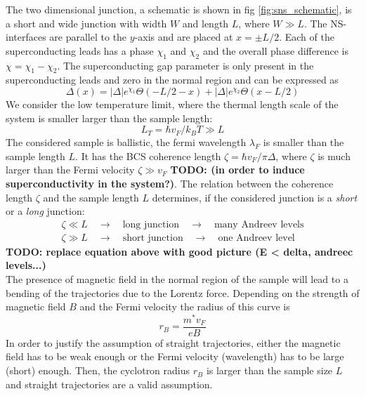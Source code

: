 The two dimensional junction, a schematic is shown in fig \ref{fig:sns_schematic}, is a short and wide junction with width $W$ and length $L$, where $W \gg L$. The NS-interfaces are parallel to the $y$-axis and are placed at $x = \pm L/2$. Each of the superconducting leads has a phase $\chi_{1}$ and $\chi_{2}$ and the overall phase difference is $\chi = \chi_{1} - \chi_{2}$. The superconducting gap parameter is only present in the superconducting leads and zero in the normal region and can be expressed as
\begin{equation}
\Delta\left( x \right) = |\Delta| e^{\chi_1} \Theta\left(-L/2 -x \right) + |\Delta| e^{\chi_2} \Theta\left(x-L/2 \right) 
\label{eq:gap_parameter}
\end{equation}
We consider the low temperature limit, where the thermal length scale of the system is smaller larger than the sample length:
\begin{equation}
L_T = \hbar v_F / k_B T \gg L
\end{equation}
The considered sample is ballistic, the fermi wavelength $\lambda_F$ is smaller than the sample length $L$. It has the BCS coherence length $\zeta = \hbar v_F / \pi \Delta$, where $\zeta$ is much larger than the Fermi velocity $\zeta \gg v_F$ 
\textbf{TODO: (in order to induce superconductivity in the system?)}. 
The relation between the coherence length $\zeta$ and the sample length $L$ determines, if the considered junction is a \textit{short} or a \textit{long} junction:
\begin{eqnarray*}
\zeta \ll L \quad \rightarrow \quad \text{long junction} \quad \rightarrow \quad \text{many Andreev levels} \\ 
\zeta \gg L \quad \rightarrow \quad \text{short junction} \quad \rightarrow \quad \text{one Andreev level} 
\end{eqnarray*}
\textbf{TODO: replace equation above with good picture (E < delta, andreec levels...)}\\
The presence of magnetic field in the normal region of the sample will lead to a bending of the trajectories due to the Lorentz force. Depending on the strength of magnetic field $B$ and the Fermi velocity the radius of this curve is 
\begin{equation}
r_B = \frac{m^* v_F}{e B}
\end{equation}
In order to justify the assumption of straight trajectories, either the magnetic field has to be weak enough or the Fermi velocity (wavelength) has to be large (short) enough. Then, the cyclotron radius $r_B$ is larger than the sample size $L$ and straight trajectories are a valid assumption. 


